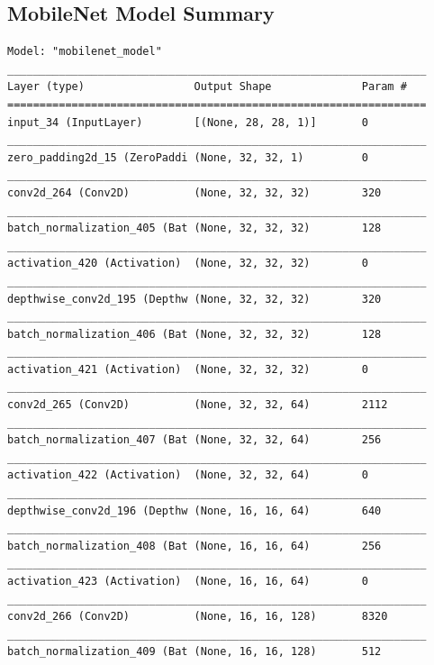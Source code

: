 \documentclass{article}
\begin{document}
\newpage
\begin{appendices}
\section{MobileNet Model Summary} \label{msum}
\begin{lstlisting}
Model: "mobilenet_model"
_________________________________________________________________
Layer (type)                 Output Shape              Param #   
=================================================================
input_34 (InputLayer)        [(None, 28, 28, 1)]       0         
_________________________________________________________________
zero_padding2d_15 (ZeroPaddi (None, 32, 32, 1)         0         
_________________________________________________________________
conv2d_264 (Conv2D)          (None, 32, 32, 32)        320       
_________________________________________________________________
batch_normalization_405 (Bat (None, 32, 32, 32)        128       
_________________________________________________________________
activation_420 (Activation)  (None, 32, 32, 32)        0         
_________________________________________________________________
depthwise_conv2d_195 (Depthw (None, 32, 32, 32)        320       
_________________________________________________________________
batch_normalization_406 (Bat (None, 32, 32, 32)        128       
_________________________________________________________________
activation_421 (Activation)  (None, 32, 32, 32)        0         
_________________________________________________________________
conv2d_265 (Conv2D)          (None, 32, 32, 64)        2112      
_________________________________________________________________
batch_normalization_407 (Bat (None, 32, 32, 64)        256       
_________________________________________________________________
activation_422 (Activation)  (None, 32, 32, 64)        0         
_________________________________________________________________
depthwise_conv2d_196 (Depthw (None, 16, 16, 64)        640       
_________________________________________________________________
batch_normalization_408 (Bat (None, 16, 16, 64)        256       
_________________________________________________________________
activation_423 (Activation)  (None, 16, 16, 64)        0         
_________________________________________________________________
conv2d_266 (Conv2D)          (None, 16, 16, 128)       8320      
_________________________________________________________________
batch_normalization_409 (Bat (None, 16, 16, 128)       512       

\end{lstlisting}
\end{appendices}
\end{document}
